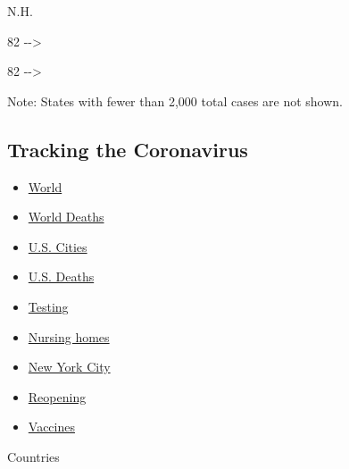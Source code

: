N.H.

82 -\/-\textgreater{}

82 -\/-\textgreater{}

Note: States with fewer than 2,000 total cases are not shown.

\hypertarget{tracking-the-coronavirus}{%
\subsection{Tracking the Coronavirus}\label{tracking-the-coronavirus}}

\begin{itemize}
\tightlist
\item
  \href{https://www.nytimes3xbfgragh.onion/interactive/2020/world/coronavirus-maps.html}{World}
\item
  \href{https://www.nytimes3xbfgragh.onion/interactive/2020/04/21/world/coronavirus-missing-deaths.html}{World
  Deaths}
\item
  \href{https://www.nytimes3xbfgragh.onion/interactive/2020/04/23/upshot/five-ways-to-monitor-coronavirus-outbreak-us.html}{U.S.
  Cities}
\item
  \href{https://www.nytimes3xbfgragh.onion/interactive/2020/05/05/us/coronavirus-death-toll-us.html}{U.S.
  Deaths}
\item
  \href{https://www.nytimes3xbfgragh.onion/interactive/2020/us/coronavirus-testing.html}{Testing}
\item
  \href{https://www.nytimes3xbfgragh.onion/interactive/2020/us/coronavirus-nursing-homes.html}{Nursing
  homes}
\item
  \href{https://www.nytimes3xbfgragh.onion/interactive/2020/nyregion/new-york-city-coronavirus-cases.html}{New
  York City}
\item
  \href{https://www.nytimes3xbfgragh.onion/interactive/2020/us/states-reopen-map-coronavirus.html}{Reopening}
\item
  \href{https://www.nytimes3xbfgragh.onion/interactive/2020/science/coronavirus-vaccine-tracker.html}{Vaccines}
\end{itemize}

Countries

